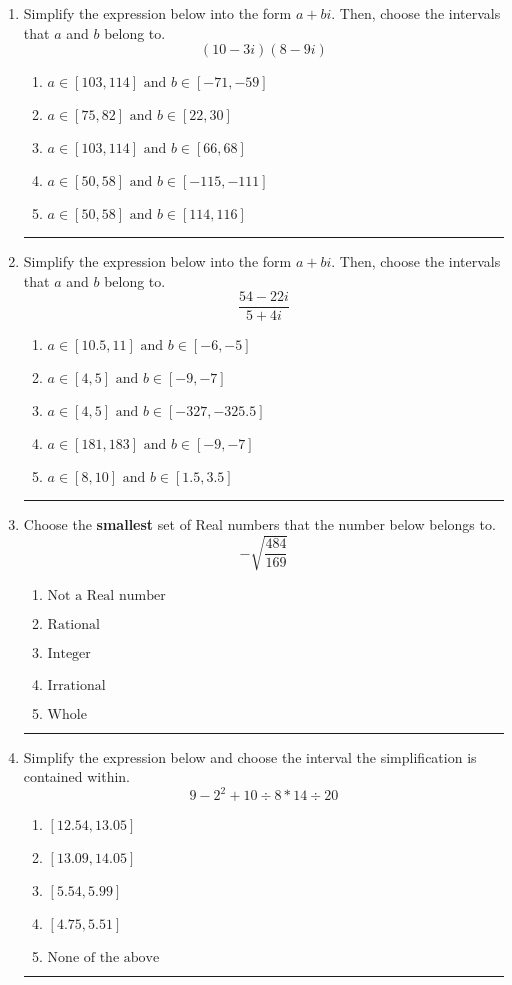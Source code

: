\documentclass[14pt]{extbook}
\newcommand{\litem}[1]{\item#1\hspace*{-1cm}\rule{\textwidth}{0.4pt}}
\begin{document}
\begin{enumerate}
\litem{
Simplify the expression below into the form $a+bi$. Then, choose the intervals that $a$ and $b$ belong to.\[ (10 - 3 i)(8 - 9 i) \]\begin{enumerate}[label=\Alph*.]
\item \( a \in [103, 114] \text{ and } b \in [-71, -59] \)
\item \( a \in [75, 82] \text{ and } b \in [22, 30] \)
\item \( a \in [103, 114] \text{ and } b \in [66, 68] \)
\item \( a \in [50, 58] \text{ and } b \in [-115, -111] \)
\item \( a \in [50, 58] \text{ and } b \in [114, 116] \)

\end{enumerate} }
\litem{
Simplify the expression below into the form $a+bi$. Then, choose the intervals that $a$ and $b$ belong to.\[ \frac{54 - 22 i}{5 + 4 i} \]\begin{enumerate}[label=\Alph*.]
\item \( a \in [10.5, 11] \text{ and } b \in [-6, -5] \)
\item \( a \in [4, 5] \text{ and } b \in [-9, -7] \)
\item \( a \in [4, 5] \text{ and } b \in [-327, -325.5] \)
\item \( a \in [181, 183] \text{ and } b \in [-9, -7] \)
\item \( a \in [8, 10] \text{ and } b \in [1.5, 3.5] \)

\end{enumerate} }
\litem{
Choose the \textbf{smallest} set of Real numbers that the number below belongs to.\[ -\sqrt{\frac{484}{169}} \]\begin{enumerate}[label=\Alph*.]
\item \( \text{Not a Real number} \)
\item \( \text{Rational} \)
\item \( \text{Integer} \)
\item \( \text{Irrational} \)
\item \( \text{Whole} \)

\end{enumerate} }
\litem{
Simplify the expression below and choose the interval the simplification is contained within.\[ 9 - 2^2 + 10 \div 8 * 14 \div 20 \]\begin{enumerate}[label=\Alph*.]
\item \( [12.54, 13.05] \)
\item \( [13.09, 14.05] \)
\item \( [5.54, 5.99] \)
\item \( [4.75, 5.51] \)
\item \( \text{None of the above} \)


\end{enumerate}}
\end{enumerate}
\end{document}
